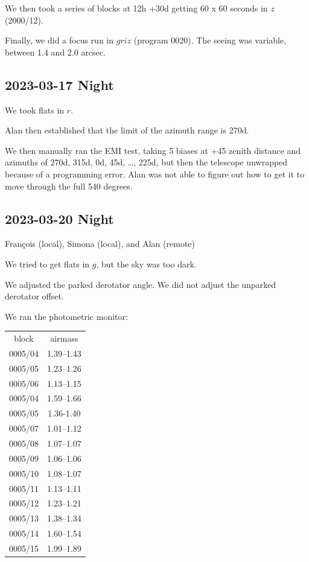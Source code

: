 \documentclass{article}
\begin{document}
We then took a series of blocks at 12h +30d getting 60 x 60 seconds in $z$ (2000/12).

Finally, we did a focus run in $griz$ (program 0020). The seeing was variable, between 1.4 and 2.0 arcsec.

\subsection{2023-03-17 Night}

We took flats in $r$.

Alan then established that the limit of the azimuth range is 270d.

We then manually ran the EMI test, taking 5 biases at +45 zenith distance and azimuths of 270d, 315d, 0d, 45d, …, 225d, but then the telescope unwrapped because of a programming error. Alan was not able to figure out how to get it to move through the full 540 degrees.

\subsection{2023-03-20 Night}

François (local), Simona (local), and Alan (remote)

We tried to get flats in $g$, but the sky was too dark.

We adjusted the parked derotator angle. We did not adjust the unparked derotator offset.

We ran the photometric monitor:

\begin{tabular}{cc}
block	&airmass\\
0005/04	&1.39–1.43\\
0005/05	&1.23–1.26\\
0005/06	&1.13–1.15\\
0005/04	&1.59–1.66\\
0005/05	&1.36-1.40\\
0005/07	&1.01–1.12\\
0005/08	&1.07–1.07\\
0005/09	&1.06–1.06\\
0005/10	&1.08–1.07\\
0005/11	&1.13–1.11\\
0005/12	&1.23–1.21\\
0005/13	&1.38–1.34\\
0005/14	&1.60–1.54\\
0005/15	&1.99–1.89\\
\end{tabular}
\end{document}
